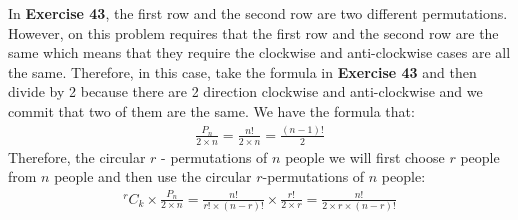 \documentclass{article}
\theoremstyle{mytheoremstyle}
\theoremstyle{mytheoremstyle}
\theoremstyle{myproblemstyle}
\begin{document}
    In \textbf{Exercise 43}, the first row and the second row are two different permutations. However, on this
    problem requires that the first row and the second row are the same which means that they require the clockwise
    and anti-clockwise cases are all the same. Therefore, in this case, take the formula in \textbf{Exercise 43} and
    then divide by 2 because there are 2 direction clockwise and anti-clockwise and we commit that two of them
    are the same. We have the formula that:
    \begin{align*}
        \frac{P_n}{2 \times n} = \frac{n!}{2 \times n} = \frac{(n - 1)!}{2}
    \end{align*}
    Therefore, the circular \(r\) - permutations of \(n\) people we will first choose \(r\) people from \(n\) people and then
    use the circular \(r\)-permutations of \(n\) people:
    \begin{align*}
        ^rC_k \times \frac{P_n}{2 \times n} = \frac{n!}{r! \times (n - r)!} \times \frac{r!}{2 \times r} = \frac{n!}{2 \times r \times (n -r)!}
    \end{align*}
\end{document}
